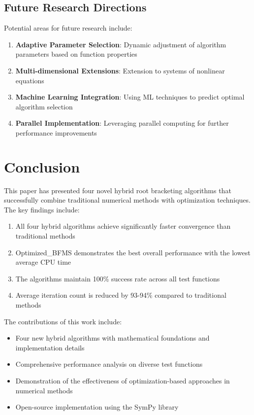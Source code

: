 \documentclass[11pt,a4paper]{article}
\begin{document}
\subsection{Future Research Directions}

Potential areas for future research include:

\begin{enumerate}
    \item \textbf{Adaptive Parameter Selection}: Dynamic adjustment of algorithm parameters based on function properties
    \item \textbf{Multi-dimensional Extensions}: Extension to systems of nonlinear equations
    \item \textbf{Machine Learning Integration}: Using ML techniques to predict optimal algorithm selection
    \item \textbf{Parallel Implementation}: Leveraging parallel computing for further performance improvements
\end{enumerate}

\section{Conclusion}

This paper has presented four novel hybrid root bracketing algorithms that successfully combine traditional numerical methods with optimization techniques. The key findings include:

\begin{enumerate}
    \item All four hybrid algorithms achieve significantly faster convergence than traditional methods
    \item Optimized\_BFMS demonstrates the best overall performance with the lowest average CPU time
    \item The algorithms maintain 100\% success rate across all test functions
    \item Average iteration count is reduced by 93-94\% compared to traditional methods
\end{enumerate}

The contributions of this work include:

\begin{itemize}
    \item Four new hybrid algorithms with mathematical foundations and implementation details
    \item Comprehensive performance analysis on diverse test functions
    \item Demonstration of the effectiveness of optimization-based approaches in numerical methods
    \item Open-source implementation using the SymPy library
\end{itemize}
\end{document}
